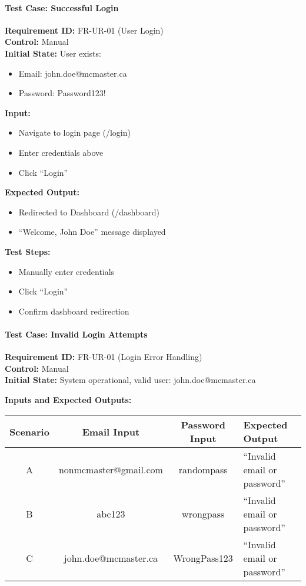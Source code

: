 \documentclass[12pt, titlepage]{article}
\begin{document}
\paragraph{Test Case: Successful Login}
\textbf{Requirement ID:} FR-UR-01 (User Login) \\
\textbf{Control:} Manual \\
\textbf{Initial State:} User exists:
\begin{itemize}
    \item Email: john.doe@mcmaster.ca
    \item Password: Password123!
\end{itemize}
\textbf{Input:}
\begin{itemize}
    \item Navigate to login page (/login)
    \item Enter credentials above
    \item Click ``Login''
\end{itemize}
\textbf{Expected Output:}
\begin{itemize}
    \item Redirected to Dashboard (/dashboard)
    \item ``Welcome, John Doe'' message displayed
\end{itemize}
\textbf{Test Steps:}
\begin{itemize}
    \item Manually enter credentials
    \item Click ``Login''
    \item Confirm dashboard redirection
\end{itemize}

\paragraph{Test Case: Invalid Login Attempts}
\textbf{Requirement ID:} FR-UR-01 (Login Error Handling) \\
\textbf{Control:} Manual \\
\textbf{Initial State:} System operational, valid user: john.doe@mcmaster.ca

\textbf{Inputs and Expected Outputs:}

\begin{longtable}{|c|c|c|p{6cm}|}
\hline
\textbf{Scenario} & \textbf{Email Input} & \textbf{Password Input} & \textbf{Expected Output} \\
\hline
A & nonmcmaster@gmail.com & randompass & ``Invalid email or password'' \\
\hline
B & abc123 & wrongpass & ``Invalid email or password'' \\
\hline
C & john.doe@mcmaster.ca & WrongPass123 & ``Invalid email or password'' \\
\hline
\end{longtable}
\end{document}
